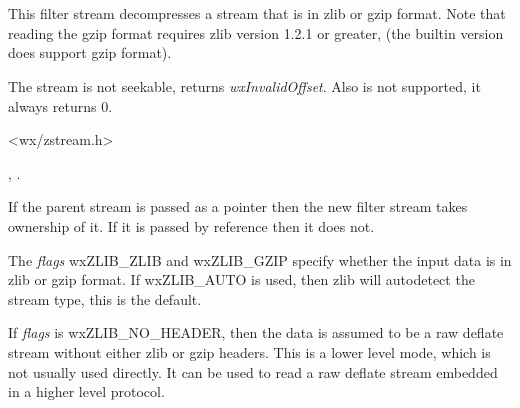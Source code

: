 \section{}\label{wxzlibinputstream}

This filter stream decompresses a stream that is in zlib or gzip format.
Note that reading the gzip format requires zlib version 1.2.1 or greater,
(the builtin version does support gzip format).

The stream is not seekable,  returns
 {\it wxInvalidOffset}. Also  is
not supported, it always returns $0$.




<wx/zstream.h>


, 
 .


\label{wxzlibinputstreamwxzlibinputstream}



If the parent stream is passed as a pointer then the new filter stream
takes ownership of it. If it is passed by reference then it does not.

The {\it flags} wxZLIB\_ZLIB and wxZLIB\_GZIP specify whether the input data
is in zlib or gzip format. If wxZLIB\_AUTO is used, then zlib will
autodetect the stream type, this is the default.

If {\it flags} is wxZLIB\_NO\_HEADER, then the data is assumed to be a raw
deflate stream without either zlib or gzip headers. This is a lower level
mode, which is not usually used directly. It can be used to read a raw
deflate stream embedded in a higher level protocol.

